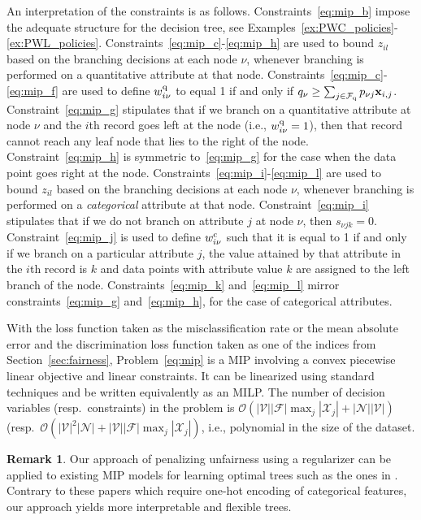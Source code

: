 \documentclass[letterpaper]{article} %
\theoremstyle{definition}
\newtheorem{remark}{Remark}[section]
\newcommand{\sets}[1]{\ensuremath{\mathcal{#1}}}
\newcommand{\1}{\ensuremath{{\rm e}}} %
\begin{document}
An interpretation of the constraints is as follows. Constraints~\eqref{eq:mip_b} impose the adequate structure for the decision tree, see Examples~\ref{ex:PWC_policies}-\ref{ex:PWL_policies}. Constraints~\eqref{eq:mip_c}-\eqref{eq:mip_h} are used to bound $z_{il}$ based on the branching decisions at each node $\nu$, whenever branching is performed on a quantitative attribute at that node. Constraints~\eqref{eq:mip_c}-\eqref{eq:mip_f} are used to define $w_{i\nu}^{\rm q}$ to equal 1 if and only if $q_\nu \geq \sum_{j \in \sets F_{{\rm q}}} p_{\nu j} {\bf x}_{i,j}$. Constraint~\eqref{eq:mip_g} stipulates that if we branch on a quantitative attribute at node $\nu$ and the $i$th record goes left at the node (i.e., $w_{i\nu}^{\rm q}=1$), then that record cannot reach any leaf node that lies to the right of the node. Constraint~\eqref{eq:mip_h} is symmetric to~\eqref{eq:mip_g} for the case when the data point goes right at the node. Constraints~\eqref{eq:mip_i}-\eqref{eq:mip_l} are used to bound $z_{il}$ based on the branching decisions at each node $\nu$, whenever branching is performed on a \emph{categorical} attribute at that node. Constraint~\eqref{eq:mip_i} stipulates that if we do not branch on attribute $j$ at node $\nu$, then $s_{\nu j k}=0$. Constraint~\eqref{eq:mip_j} is used to define $w_{i\nu}^{\rm c}$ such that it is equal to 1 if and only if we branch on a particular attribute $j$, the value attained by that attribute in the $i$th record is $k$ and data points with attribute value $k$ are assigned to the left branch of the node. Constraints~\eqref{eq:mip_k} and~\eqref{eq:mip_l} mirror constraints~\eqref{eq:mip_g} and~\eqref{eq:mip_h}, for the case of categorical attributes.

With the loss function taken as the misclassification rate or the mean absolute error and the discrimination loss function taken as one of the indices from Section~\ref{sec:fairness}, Problem~\eqref{eq:mip} is a MIP involving a convex piecewise linear objective and linear constraints. It can be linearized using standard techniques and be written equivalently as an MILP. The number of decision variables (resp.\ constraints) in the problem is $\mathcal O(|\mathcal V| | \mathcal F| \max_j |\mathcal X_j| + |\mathcal N| |\mathcal V| )$ (resp.\ $\mathcal O(|\mathcal V|^2|\mathcal N| + |\mathcal V| |\mathcal F| \max_j |\mathcal X_j|)$, i.e., polynomial in the size of the dataset.


\begin{remark}
Our approach of penalizing unfairness using a regularizer can be applied to existing MIP models for learning optimal trees such as the ones in \cite{verwer2017,Bertsimas2017}. Contrary to these papers which require one-hot encoding of categorical features, our approach yields more interpretable and flexible trees.
\end{remark}
\end{document}
